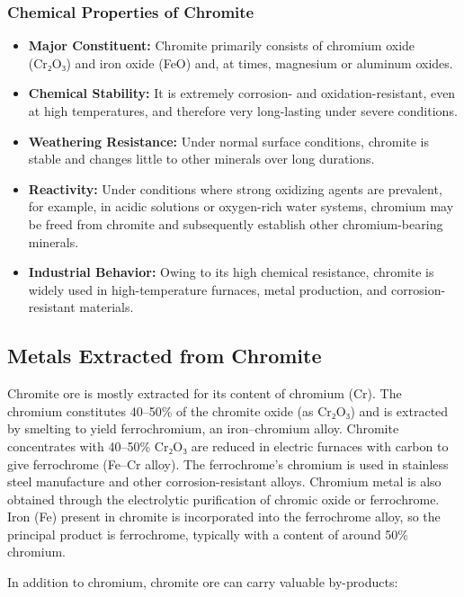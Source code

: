 \documentclass[12pt,a4paper, top=1.9cm, bottom=2.03cm, left=3.81cm, right=1.9cm]{article}
\begin{document}
\subsubsection{Chemical Properties of Chromite}
\begin{itemize}[label=\textbullet]  %
\item \textbf{Major Constituent:} Chromite primarily consists of chromium oxide (Cr₂O₃) and iron oxide (FeO) and, at times, magnesium or aluminum oxides.
\item \textbf{Chemical Stability:} It is extremely corrosion- and oxidation-resistant, even at high temperatures, and therefore very long-lasting under severe conditions.
\item \textbf{Weathering Resistance:} Under normal surface conditions, chromite is stable and changes little to other minerals over long durations.
\item \textbf{Reactivity:} Under conditions where strong oxidizing agents are prevalent, for example, in acidic solutions or oxygen-rich water systems, chromium may be freed from chromite and subsequently establish other chromium-bearing minerals.
\item \textbf{Industrial Behavior:} Owing to its high chemical resistance, chromite is widely used in high-temperature furnaces, metal production, and corrosion-resistant materials.
\end{itemize}
\subsection{Metals Extracted from Chromite}
\noindent\fontsize{12}{14}\selectfont Chromite ore is mostly extracted for its content of chromium (Cr). The chromium constitutes 40–50\% of the chromite oxide (as Cr₂O₃) and is extracted by smelting to yield ferrochromium, an iron–chromium alloy. Chromite concentrates with 40–50\% Cr₂O₃ are reduced in electric furnaces with carbon to give ferrochrome (Fe–Cr alloy). The ferrochrome's chromium is used in stainless steel manufacture and other corrosion-resistant alloys. Chromium metal is also obtained through the electrolytic purification of chromic oxide or ferrochrome. Iron (Fe) present in chromite is incorporated into the ferrochrome alloy, so the principal product is ferrochrome, typically with a content of around 50\% chromium.

\noindent\fontsize{12}{14}\selectfont In addition to chromium, chromite ore can carry valuable by-products:
\end{document}
